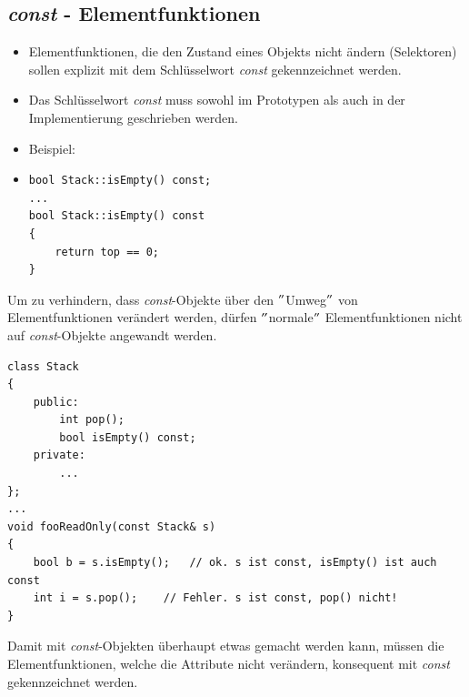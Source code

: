 \subsection{\emph{const} - Elementfunktionen}
\begin{itemize}
	\item Elementfunktionen, die den Zustand eines Objekts nicht ändern (Selektoren) sollen explizit mit dem Schlüsselwort \emph{const} gekennzeichnet werden.
	\item Das Schlüsselwort \emph{const} muss sowohl im Prototypen als auch in der Implementierung geschrieben werden.
	\item Beispiel:
	\item[\-] \vspace{-\baselineskip}
	\begin{minipage}{0.4\linewidth}
\begin{lstlisting}
bool Stack::isEmpty() const;
...
bool Stack::isEmpty() const
{
	return top == 0;
}
\end{lstlisting}
	\end{minipage}
\end{itemize}
Um zu verhindern, dass \emph{const}-Objekte über den $"$Umweg$"$ von Elementfunktionen verändert werden, dürfen $"$normale$"$ Elementfunktionen nicht auf \emph{const}-Objekte angewandt werden.
\noindent
\begin{minipage}{0.9\linewidth}
\begin{lstlisting}
class Stack
{
	public:
		int pop();
		bool isEmpty() const;
	private:
		...
};
...
void fooReadOnly(const Stack& s)
{
	bool b = s.isEmpty();	// ok. s ist const, isEmpty() ist auch const
	int i = s.pop();	// Fehler. s ist const, pop() nicht!
}
\end{lstlisting}
\end{minipage}

\begin{hinweis}
Damit mit \emph{const}-Objekten überhaupt etwas gemacht werden kann, müssen die Elementfunktionen, welche die Attribute nicht verändern, konsequent mit \emph{const} gekennzeichnet werden.
\end{hinweis}

